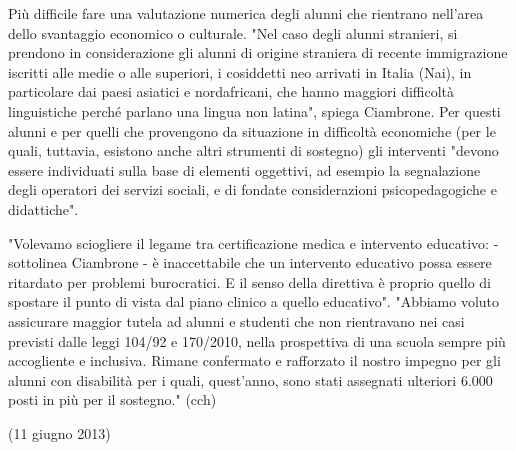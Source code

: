 Più difficile fare una valutazione numerica degli alunni che rientrano nell'area dello svantaggio economico o culturale. "Nel caso degli alunni stranieri, si prendono in considerazione gli alunni di origine straniera di recente immigrazione iscritti alle medie o alle superiori, i cosiddetti neo arrivati in Italia (Nai), in particolare dai paesi asiatici e nordafricani, che hanno maggiori difficoltà linguistiche perché parlano una lingua non latina", spiega Ciambrone. Per questi alunni e per quelli che provengono da situazione in difficoltà economiche (per le quali, tuttavia, esistono anche altri strumenti di sostegno) gli interventi "devono essere individuati sulla base di elementi oggettivi, ad esempio la segnalazione degli operatori dei servizi sociali, e di fondate considerazioni psicopedagogiche e didattiche".

"Volevamo sciogliere il legame tra certificazione medica e intervento educativo: - sottolinea Ciambrone - è inaccettabile che un intervento educativo possa essere ritardato per problemi burocratici. E il senso della direttiva è proprio quello di spostare il punto di vista dal piano clinico a quello educativo". "Abbiamo voluto assicurare maggior tutela ad alunni e studenti che non rientravano nei casi previsti dalle leggi 104/92 e 170/2010, nella prospettiva di una scuola sempre più accogliente e inclusiva. Rimane confermato e rafforzato il nostro impegno per gli alunni con disabilità per i quali, quest'anno, sono stati assegnati ulteriori 6.000 posti in più per il sostegno." (cch)

(11 giugno 2013)
